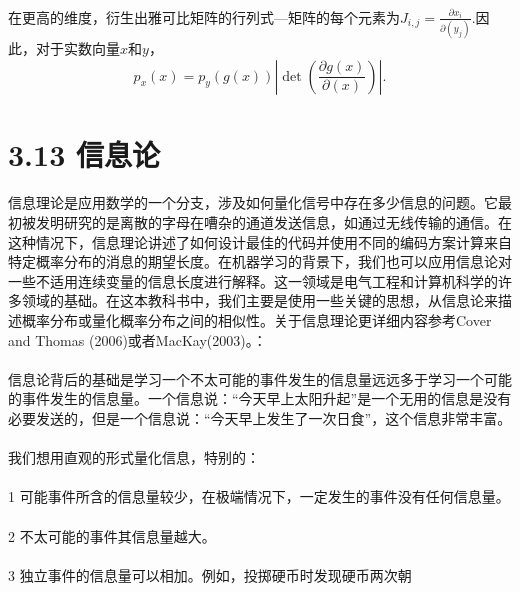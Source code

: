 \documentclass{article}
\begin{document}
   \paragraph{}
   在更高的维度，衍生出雅可比矩阵的行列式—矩阵的每个元素为$J_{i,j}=\frac{\partial{x_{i}}}{\partial(y_{j})}$.因此，对于实数向量$x$和$y$，
   \begin{equation}
      p_{x}(x)=p_{y}(g(x))|\det{(\frac{\partial{g(x)}}{\partial(x)})}|.\tag{3.47}
   \end{equation}


    \section*{3.13 信息论}
   \paragraph{}
  信息理论是应用数学的一个分支，涉及如何量化信号中存在多少信息的问题。它最初被发明研究的是离散的字母在嘈杂的通道发送信息，如通过无线传输的通信。在这种情况下，信息理论讲述了如何设计最佳的代码并使用不同的编码方案计算来自特定概率分布的消息的期望长度。在机器学习的背景下，我们也可以应用信息论对一些不适用连续变量的信息长度进行解释。这一领域是电气工程和计算机科学的许多领域的基础。在这本教科书中，我们主要是使用一些关键的思想，从信息论来描述概率分布或量化概率分布之间的相似性。关于信息理论更详细内容参考Cover and Thomas (2006)或者MacKay(2003)。：
   \paragraph{}
   信息论背后的基础是学习一个不太可能的事件发生的信息量远远多于学习一个可能的事件发生的信息量。一个信息说：“今天早上太阳升起”是一个无用的信息是没有必要发送的，但是一个信息说：“今天早上发生了一次日食”，这个信息非常丰富。
   \paragraph{}
   我们想用直观的形式量化信息，特别的：
   \paragraph{}
   1 可能事件所含的信息量较少，在极端情况下，一定发生的事件没有任何信息量。
   \paragraph{}
  2 不太可能的事件其信息量越大。
  \paragraph{}
  3 独立事件的信息量可以相加。例如，投掷硬币时发现硬币两次朝
\end{document}
